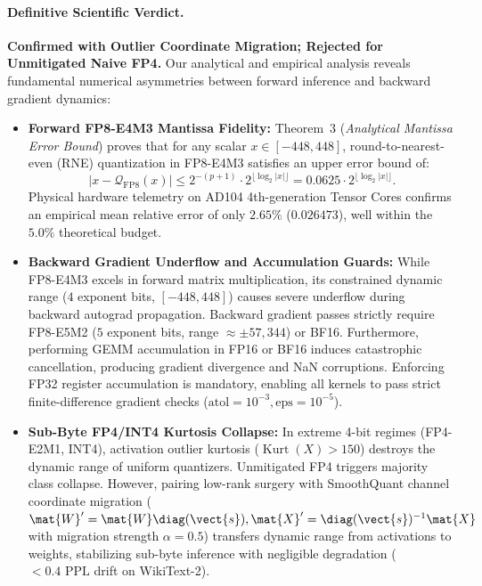 \paragraph{Definitive Scientific Verdict.}
\textbf{Confirmed with Outlier Coordinate Migration; Rejected for Unmitigated Naive FP4.}
Our analytical and empirical analysis reveals fundamental numerical asymmetries between forward inference and backward gradient dynamics:
\begin{itemize}
    \item \textbf{Forward FP8-E4M3 Mantissa Fidelity:}
    Theorem~3 (\emph{Analytical Mantissa Error Bound}) proves that for any scalar $x \in [-448, 448]$, round-to-nearest-even (RNE) quantization in FP8-E4M3 satisfies an upper error bound of:
    \begin{equation}
        |x - \mathcal{Q}_{\text{FP8}}(x)| \le 2^{-(p+1)} \cdot 2^{\lfloor \log_2 |x| \rfloor} = 0.0625 \cdot 2^{\lfloor \log_2 |x| \rfloor}.
    \end{equation}
    Physical hardware telemetry on AD104 4th-generation Tensor Cores confirms an empirical mean relative error of only $2.65\%$ ($0.026473$), well within the $5.0\%$ theoretical budget.
    \item \textbf{Backward Gradient Underflow and Accumulation Guards:}
    While FP8-E4M3 excels in forward matrix multiplication, its constrained dynamic range ($4$ exponent bits, $[-448, 448]$) causes severe underflow during backward autograd propagation.
    Backward gradient passes strictly require FP8-E5M2 ($5$ exponent bits, range $\approx \pm 57{,}344$) or BF16.
    Furthermore, performing GEMM accumulation in FP16 or BF16 induces catastrophic cancellation, producing gradient divergence and NaN corruptions.
    Enforcing FP32 register accumulation is mandatory, enabling all kernels to pass strict finite-difference gradient checks ($\text{atol} = 10^{-3}, \text{eps} = 10^{-5}$).
    \item \textbf{Sub-Byte FP4/INT4 Kurtosis Collapse:}
    In extreme 4-bit regimes (FP4-E2M1, INT4), activation outlier kurtosis ($\operatorname{Kurt}(X) > 150$) destroys the dynamic range of uniform quantizers.
    Unmitigated FP4 triggers majority class collapse.
    However, pairing low-rank surgery with SmoothQuant channel coordinate migration ($\mat{W}' = \mat{W}\diag(\vect{s}), \mat{X}' = \diag(\vect{s})^{-1}\mat{X}$ with migration strength $\alpha = 0.5$) transfers dynamic range from activations to weights, stabilizing sub-byte inference with negligible degradation ($<0.4\text{ PPL}$ drift on WikiText-2).
\end{itemize}

